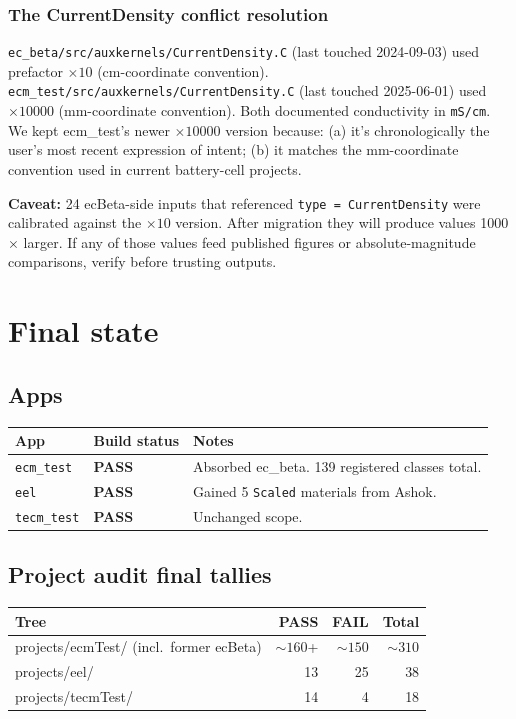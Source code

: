 \documentclass[11pt,letterpaper]{article}
\newcommand{\code}[1]{\texttt{\small #1}}
\newcommand{\PASS}{\textcolor{passgreen}{\textbf{PASS}}}
\begin{document}
\subsubsection*{The CurrentDensity conflict resolution}

\code{ec\_beta/src/auxkernels/CurrentDensity.C} (last touched 2024-09-03) used
prefactor $\times 10$ (cm-coordinate convention). \code{ecm\_test/src/auxkernels/CurrentDensity.C}
(last touched 2025-06-01) used $\times 10000$ (mm-coordinate convention). Both
documented conductivity in \code{mS/cm}. We kept ecm\_test's newer
$\times 10000$ version because: (a) it's chronologically the user's most recent
expression of intent; (b) it matches the mm-coordinate convention used in
current battery-cell projects.

\textbf{Caveat:} 24 ecBeta-side inputs that referenced \code{type = CurrentDensity}
were calibrated against the $\times 10$ version. After migration they will produce
values 1000$\times$ larger. If any of those values feed published figures or
absolute-magnitude comparisons, verify before trusting outputs.

\section{Final state}

\subsection{Apps}

\begin{tabular}{l l l}
\toprule
App & Build status & Notes \\
\midrule
\code{ecm\_test} & \PASS & Absorbed ec\_beta. 139 registered classes total. \\
\code{eel} & \PASS & Gained 5 \code{*Scaled} materials from Ashok. \\
\code{tecm\_test} & \PASS & Unchanged scope. \\
\bottomrule
\end{tabular}

\subsection{Project audit final tallies}

\begin{tabular}{l r r r}
\toprule
Tree & PASS & FAIL & Total \\
\midrule
projects/ecmTest/ (incl.\ former ecBeta) & ${\sim}160$+ & ${\sim}150$ & ${\sim}310$ \\
projects/eel/ & 13 & 25 & 38 \\
projects/tecmTest/ & 14 & 4 & 18 \\
\bottomrule
\end{tabular}
\end{document}
